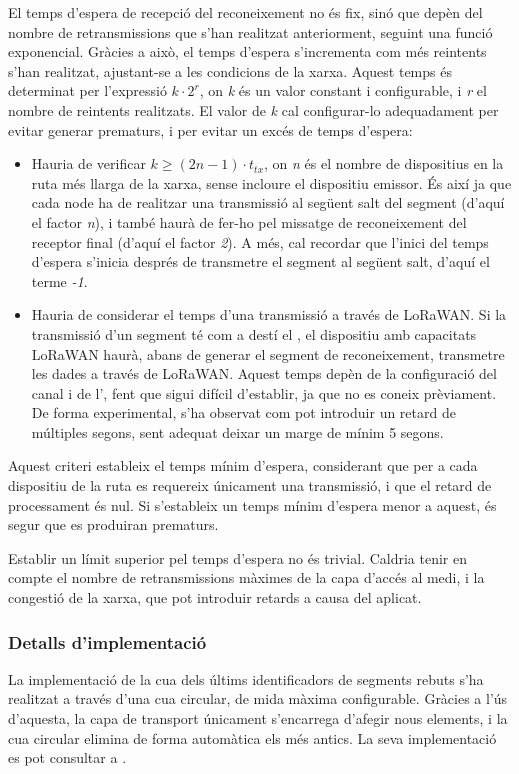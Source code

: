 \documentclass{tfgitic}[2024/07/01]
\begin{document}
{El temps d'espera de recepció del reconeixement no és fix, sinó que depèn del nombre de retransmissions que s'han realitzat anteriorment, seguint una funció exponencial. Gràcies a això, el temps d'espera s'incrementa com més reintents s'han realitzat, ajustant-se a les condicions de la xarxa.
Aquest temps és determinat per l'expressió $k\cdot 2^r$, on \emph{k} és un valor constant i configurable, i \emph{r} el nombre de reintents realitzats. El valor de \emph{k} cal configurar-lo adequadament per evitar generar  prematurs, i per evitar un excés de temps d'espera:
\begin{itemize}
    \item Hauria de verificar $k\ge (2n-1)\cdot t_{tx}$, on \emph{n} és el nombre de dispositius en la ruta més llarga de la xarxa, sense incloure el dispositiu emissor. És així ja que cada node ha de realitzar una transmissió al següent salt del segment (d'aquí el factor \emph{n}), i també haurà de fer-ho pel missatge de reconeixement del receptor final (d'aquí el factor \emph{2}). A més, cal recordar que l'inici del temps d'espera s'inicia després de transmetre el segment al següent salt, d'aquí el terme \emph{-1}.
    \item Hauria de considerar el temps d'una transmissió a través de LoRaWAN. Si la transmissió d'un segment té com a destí el , el dispositiu amb capacitats LoRaWAN haurà, abans de generar el segment de reconeixement, transmetre les dades a través de LoRaWAN. Aquest temps depèn de la configuració del canal i de l', fent que sigui difícil d'establir, ja que no es coneix prèviament. De forma experimental, s'ha observat com pot introduir un retard de múltiples segons, sent adequat deixar un marge de mínim 5 segons. 
\end{itemize}
Aquest criteri estableix el temps mínim d'espera, considerant que per a cada dispositiu de la ruta es requereix únicament una transmissió, i que el retard de processament és nul. Si s'estableix un temps mínim d'espera menor a aquest, és segur que es produiran  prematurs.

Establir un límit superior pel temps d'espera no és trivial. Caldria tenir en compte el nombre de retransmissions màximes de la capa d'accés al medi, i la congestió de la xarxa, que pot introduir retards a causa del  aplicat. 
\subsubsection{Detalls d'implementació}
La implementació de la cua dels últims identificadors de segments rebuts s'ha realitzat a través d'una cua circular, de mida màxima configurable. Gràcies a l'ús d'aquesta, la capa de transport únicament s'encarrega d'afegir nous elements, i la cua circular elimina de forma automàtica els més antics. La seva implementació es pot consultar a .

}
\end{document}
